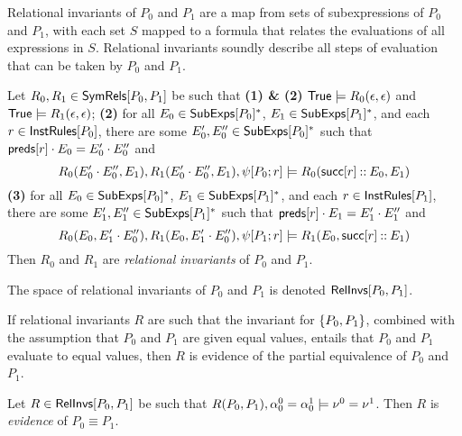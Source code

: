 Relational invariants of $P_0$ and $P_1$ are a map from sets of
subexpressions of $P_0$ and $P_1$, with each set $S$ mapped to a
formula that relates the evaluations of all expressions in $S$.
%
Relational invariants soundly describe all steps of evaluation that
can be taken by $P_0$ and $P_1$.
%
\begin{defn}
  \label{defn:rel-invs}
  Let $R_0, R_1 \in \mathsf{SymRels}[ P_0, P_1 ]$ be such that %
  \textbf{(1) \& (2)} $\mathsf{True} \models R_0(\epsilon, \epsilon)$ and
  $\mathsf{True} \models R_1(\epsilon, \epsilon)$;
  \textbf{(2)} for all $E_0 \in \mathsf{SubExps}[ P_0 ]^{*}$, %
  $E_1 \in \mathsf{SubExps}[ P_1 ]^{*}$, and %
  each $r \in \mathsf{InstRules}[ P_0 ]$, %
  there are some $E_0', E_0'' \in \mathsf{SubExps}[ P_0 ]^{*}$ such that
  $\mathsf{preds}[ r ] \cdot E_0 = E_0' \cdot E_0''$ and
  \[ R_0(E_0' \concat E_0'', E_1), %
  R_1(E_0' \concat E_0'', E_1), %
  \symstep{ P_0 }{ r } \entails R_0(\rulesucc{r} \cons E_0, E_1) \]
  \textbf{(3)} for all $E_0 \in \mathsf{SubExps}[ P_0 ]^{*}$, %
  $E_1 \in \mathsf{SubExps}[ P_1 ]^{*}$, and %
  each $r \in \mathsf{InstRules}[ P_1 ]$, %
  there are some $E_1', E_1'' \in \mathsf{SubExps}[ P_1 ]^{*}$ such that
  $\mathsf{preds}[ r ] \cdot E_1 = E_1' \cdot E_1''$ and
  \[ R_0(E_0, E_1' \concat E_0''), %
  R_1(E_0, E_1' \concat E_0''), %
  \symstep{P_1}{ r } \entails R_1(E_0, \rulesucc{r} \cons E_1) \]
  Then $R_0$ and $R_1$ are \emph{relational invariants} of $P_0$ and
  $P_1$.
\end{defn}
%
The space of relational invariants of $P_0$ and $P_1$ is denoted
$\mathsf{RelInvs}[ P_0, P_1 ]$.

If relational invariants $R$ are such that the invariant for $\{ 
  P_0, P_1  \}$, combined with the assumption that $P_0$ and $P_1$ are
given equal values, entails that $P_0$ and $P_1$ evaluate to equal
values, then $R$ is evidence of the partial equivalence of $P_0$ and
$P_1$.
%
\begin{defn}
  \label{defn:eq-pf}
  Let $R \in \mathsf{RelInvs}[ P_0, P_1 ]$ be such that $R(P_0, P_1), \alpha^0_0
  = \alpha^1_0 \models \nu^0 = \nu^1$.
  Then $R$ is \emph{evidence} of $P_0 \equiv P_1$.
\end{defn}

\begin{ex}
  \label{ex:rel-invs}
\end{ex}

